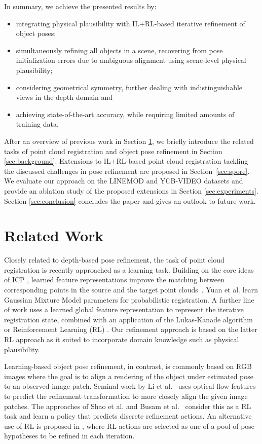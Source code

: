 \documentclass[10pt,twocolumn,letterpaper]{article}
\begin{document}
In summary, we achieve the presented results by:
\begin{itemize}
    \item integrating physical plausibility with IL+RL-based iterative refinement of object poses;
    \item simultaneously refining all objects in a scene, recovering from pose initialization errors due to ambiguous alignment using scene-level physical plausibility;
    \item considering geometrical symmetry, further dealing with indistinguishable views in the depth domain and
    \item achieving state-of-the-art accuracy, while requiring limited amounts of training data.
\end{itemize}
After an overview of previous work in Section \ref{sec:rw}, we briefly introduce the related tasks of point cloud registration and object pose refinement in Section \ref{sec:background}. Extensions to IL+RL-based point cloud registration tackling the discussed challenges in pose refinement are proposed in Section~\ref{sec:spore}. We evaluate our approach on the LINEMOD and YCB-VIDEO datasets and provide an ablation study of the proposed extensions in Section \ref{sec:experiments}. Section \ref{sec:conclusion} concludes the paper and gives an outlook to future work.

\section{Related Work}\label{sec:rw}
Closely related to depth-based pose refinement, the task of point cloud registration is recently approached as a learning task. Building on the core ideas of ICP \cite{besl1992icp}, learned feature representations improve the matching between corresponding points in the source and the target point clouds~\cite{wang2019dcp,choy2020dgr,yew2020rpmnet}. Yuan et al. \cite{yuan2020deepgmr} learn Gaussian Mixture Model parameters for probabilistic registration. A further line of work uses a learned global feature representation to represent the iterative registration state, combined with an application of the Lukas-Kanade algorithm \cite{aoki2019pointnetlk} or Reinforcement Learning (RL) \cite{bauer2021reagent}. Our refinement approach is based on the latter RL approach as it suited to incorporate domain knowledge such as physical plausibility.

Learning-based object pose refinement, in contrast, is commonly based on RGB images \cite{li2018deepim,shao2020pfrl,busam2020moveit,zakharov2019dpod} where the goal is to align a rendering of the object under estimated pose to an observed image patch. Seminal work by Li et al.~\cite{li2018deepim} uses optical flow features to predict the refinement transformation to more closely align the given image patches. The approaches of Shao et al. \cite{shao2020pfrl} and Busam et al.~\cite{busam2020moveit} consider this as a RL task and learn a policy that predicts discrete refinement actions. An alternative use of RL is proposed in \cite{krull2017poseagent}, where RL actions are selected as one of a pool of pose hypotheses to be refined in each iteration.
\end{document}
